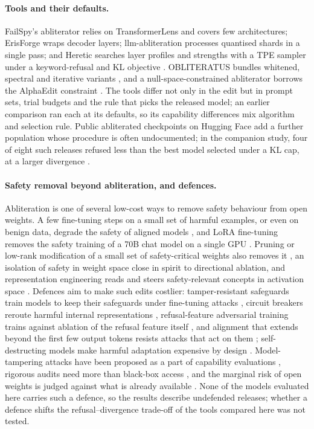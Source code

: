 \paragraph{Tools and their defaults.} FailSpy's abliterator relies on TransformerLens and covers few
architectures; ErisForge wraps decoder layers; llm-abliteration processes quantised shards in a single pass; and
Heretic searches layer profiles and strengths with a TPE sampler \cite{bergstra2011algorithms} under a
keyword-refusal and KL objective
\cite{failspy_abliterator,erisforge,jimplus_llmabliteration,heretic2025}. OBLITERATUS bundles whitened, spectral
and iterative variants \cite{obliteratus2026}, and a null-space-constrained abliterator borrows the AlphaEdit
constraint \cite{jwest33abliterator,fang2025alphaedit}. The tools differ not only in the edit but in prompt sets,
trial budgets and the rule that picks the released model; an earlier comparison \cite{young2025comparative} ran
each at its defaults, so its capability differences mix algorithm and selection rule. Public abliterated checkpoints
on Hugging Face add a further population whose procedure is often undocumented; in the companion study, four of
eight such releases refused less than the best model selected under a KL cap, at a larger divergence
\cite{young2026harder}.

\paragraph{Safety removal beyond abliteration, and defences.} Abliteration is one of several low-cost ways to
remove safety behaviour from open weights. A few fine-tuning steps on a small set of harmful examples, or even on
benign data, degrade the safety of aligned models \cite{qi2024finetuning}, and LoRA fine-tuning removes the safety
training of a 70B chat model on a single GPU \cite{lermen2023lora}. Pruning or low-rank modification of a small set of
safety-critical weights also removes it \cite{wei2024brittleness}, an isolation of safety in weight space close in
spirit to directional ablation, and representation engineering reads and steers safety-relevant concepts in
activation space \cite{zou2023representation}. Defences aim to make such edits costlier: tamper-resistant safeguards
train models to keep their safeguards under fine-tuning attacks \cite{tamirisa2025tamper}, circuit breakers reroute
harmful internal representations \cite{zou2024circuit}, refusal-feature adversarial training trains against
ablation of the refusal feature itself \cite{yu2025refat}, and alignment that extends beyond the first few output
tokens resists attacks that act on them \cite{qi2025shallow}; self-destructing models make harmful adaptation
expensive by design \cite{henderson2023selfdestructing}. Model-tampering attacks have been proposed as a part of
capability evaluations \cite{che2025tampering}, rigorous audits need more than black-box access
\cite{casper2024blackbox}, and the marginal risk of open weights is judged against what is already available
\cite{kapoor2024societal}. None of the models evaluated here carries such a defence, so the results describe
undefended releases; whether a defence shifts the refusal--divergence trade-off of the tools compared here was not
tested.

